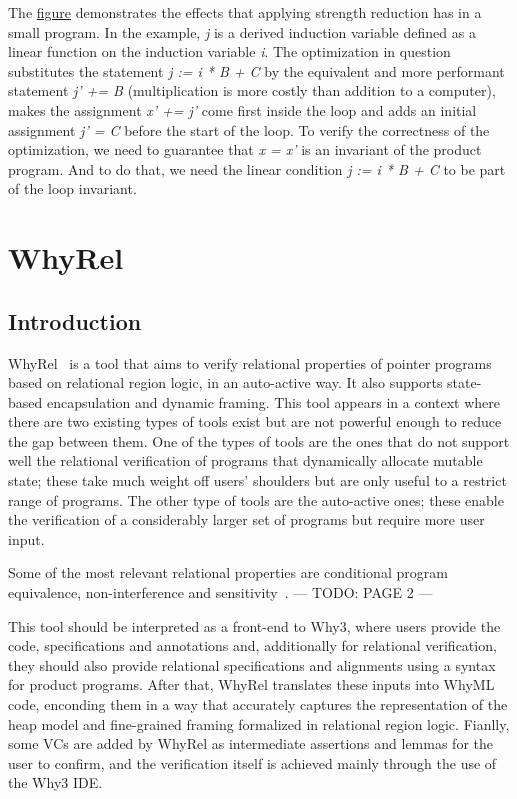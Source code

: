 The \hyperref[fig:induction_var_strength_red]{figure} demonstrates the effects that applying strength reduction has in a small program.
In the example, \emph{j} is a derived induction variable defined as a linear function on the induction variable \emph{i}.
The optimization in question substitutes the statement \emph{j := i * B + C} by the equivalent and more performant statement \emph{j' += B} (multiplication is more costly than addition to a computer), makes the assignment \emph{x' += j'} come first inside the loop and adds an initial assignment \emph{j' = C} before the start of the loop.
To verify the correctness of the optimization, we need to guarantee that \emph{x = x'} is an invariant of the product program.
And to do that, we need the linear condition \emph{j := i * B + C} to be part of the loop invariant.

\FloatBarrier
\section{WhyRel}
\label{sec:whyrel}

\subsection{Introduction}
\label{subsec:whyrel_intro}

WhyRel~\cite{whyrel} is a tool that aims to verify relational properties of pointer programs based on relational region logic, in an auto-active way.
It also supports state-based encapsulation and dynamic framing. 
This tool appears in a context where there are two existing types of tools exist but are not powerful enough to reduce the gap between them.
One of the types of tools are the ones that do not support well the relational verification of programs that dynamically allocate mutable state; these take much weight off users' shoulders but are only useful to a restrict range of programs.
The other type of tools are the auto-active ones; these enable the verification of a considerably larger set of programs but require more user input.

Some of the most relevant relational properties are conditional program equivalence, non-interference and sensitivity~\cite{barthe2019verifying}.
--- TODO: PAGE 2 ---

This tool should be interpreted as a front-end to Why3, where users provide the code, specifications and annotations and, additionally for relational verification, they should also provide relational specifications and alignments using a syntax for product programs.
After that, WhyRel translates these inputs into WhyML code, enconding them in a way that accurately captures the representation of the heap model and fine-grained framing formalized in relational region logic.
Fianlly, some VCs are added by WhyRel as intermediate assertions and lemmas for the user to confirm, and the verification itself is achieved mainly through the use of the Why3 IDE.

